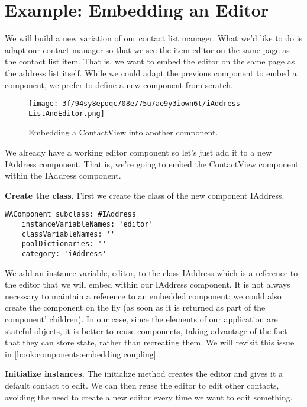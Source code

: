 \documentclass[a4paper,10pt,twoside]{book}
\newcommand{\ct}[1]{{\small\ttfamily\textup{#1}}}
\begin{document}
\section{Example: Embedding an Editor}
\label{book:components:embedding:example}

We will build a new variation of our contact list manager. What we'd like to do is adapt our contact manager so that we see the item editor on the same page as the contact list item. That is, we want to embed the editor on the same page as the address list itself. While we could adapt the previous component to embed a component, we prefer to define a new component from scratch.

\begin{figure}[h!tbp]
	\begin{center}
		\texttt{[image: 3f/94sy8epoqc708e775u7ae9y3iown6t/iAddress-ListAndEditor.png]}
		\caption{Embedding a ContactView into another component.\label{book:components:embedding:example:listeditor}}
	\end{center}
\end{figure}


We already have a working editor component so let's just add it to a new \ct{IAddress} component. That is, we're going to embed the \ct{ContactView} component within the \ct{IAddress} component.

\textbf{Create the class.} First we create the class of the new component \ct{IAddress}.

\begin{lstlisting}
WAComponent subclass: #IAddress
    instanceVariableNames: 'editor'
    classVariableNames: ''
    poolDictionaries: ''
    category: 'iAddress'
\end{lstlisting}

We add an instance variable, \ct{editor}, to the class \ct{IAddress} which is a reference to the editor that we will embed within our \ct{IAddress} component. It is not always necessary to maintain a reference to an embedded component: we could also create the component on the fly (as soon as it is returned as part of the component' children). In our case, since the elements of our application are stateful objects, it is better to reuse components, taking advantage of the fact that they can store state, rather than recreating them. We will revisit this issue in \autoref{book:components:embedding:coupling}.

\textbf{Initialize instances.} The \ct{initialize} method creates the editor and gives it a default contact to edit. We can then reuse the editor to edit other contacts, avoiding the need to create a new editor every time we want to edit something.
\end{document}
